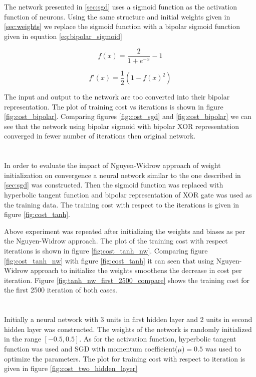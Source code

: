 \section{}
The network presented in \ref{sec:sgd} uses a sigmoid function as the activation function
of neurons. Using the same structure and initial weights given in \ref{sec:weights} we replace
the sigmoid function with a bipolar sigmoid function given in equation \ref{eq:bipolar_sigmoid}

\begin{equation}
\label{eq:bipolar_sigmoid}
 f(x)= \frac{2}{1 + e^{-x}} - 1
\end{equation}

\begin{equation}
\label{eq:bipolar_sigmoid_derivative}
 f'(x)= \frac{1}{2} (1 - f(x)^2)
\end{equation}

The input and output to the network are too converted into their bipolar representation. The
plot of training cost vs iterations is shown in figure \ref{fig:cost_bipolar}. Comparing 
figures \ref{fig:cost_sgd} and \ref{fig:cost_bipolar} we can see that the network using bipolar
sigmoid with bipolar XOR representation converged in fewer number of iterations then original
network.

\section{}
In order to evaluate the impact of Nguyen-Widrow approach of weight initialization on convergence
a neural network similar to the one described in \ref{sec:sgd} was constructed. Then the
sigmoid function was replaced with hyperbolic tangent function and bipolar representation of XOR
gate was used as the training data. The training cost with respect to the iterations is given in figure
\ref{fig:cost_tanh}. \newline

Above experiment was repeated after initializing the weights and biases as per the Nguyen-Widrow
approach. The plot of the training cost with respect iterations is shown in figure \ref{fig:cost_tanh_nw}.
Comparing figure \ref{fig:cost_tanh_nw} with figure \ref{fig:cost_tanh} it can seen that using Nguyen-Widrow approach
to initialize the weights smoothens the decrease in cost per iteration. Figure \ref{fig:tanh_nw_first_2500_compare} shows
the training cost for the first 2500 iteration of both cases.

\section{}
Initially a neural network with 3 units in first hidden layer and 2 units in second hidden layer was constructed.
The weights of the network is randomly initialized in the range $[-0.5, 0.5]$. As for the activation function,
hyperbolic tangent function was used and SGD with momentum coefficient($\mu$)$=0.5$ was used to optimize the parameters.
The plot for training cost with respect to iteration is given in figure \ref{fig:cost_two_hidden_layer}

